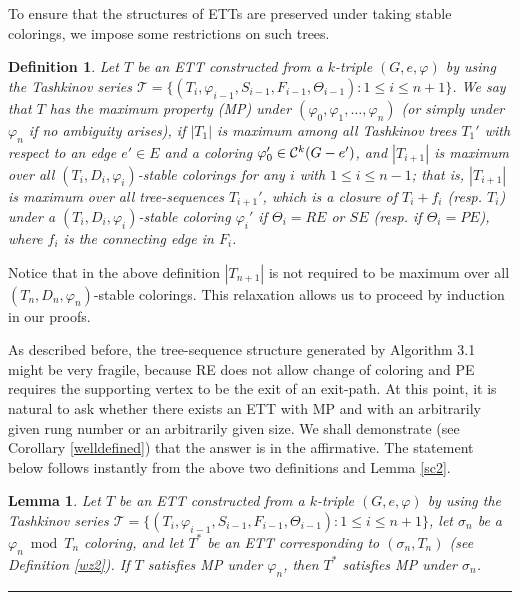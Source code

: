 \documentclass[11pt]{article}
\newtheorem{definition}[theorem]{Definition}
\newtheorem{lemma}[theorem]{Lemma}
\newcommand{\TT}{\mathcal {T}}
\newcommand{\phiv}{\varphi}
\def\qed{\hfill \rule{4pt}{7pt}}
\begin{document}
\vskip 2mm


To ensure that the structures of ETTs are preserved under taking stable colorings, we impose some restrictions
on such trees. 

\begin{definition} \label{wz3}
{\rm Let $T$ be an ETT constructed from a $k$-triple $(G,e, \varphi)$ by using the Tashkinov series 
$\TT=\{(T_i, \phiv_{i-1}, S_{i-1}, F_{i-1}, \Theta_{i-1}): 1\le i \le n+1\}$. We say that $T$ has the {\em maximum property}\label{maximumproperty} 
(MP) under $(\varphi_0, \varphi_1, \ldots, \varphi_n)$ (or simply under $\varphi_n$ if no ambiguity arises), 
if $|T_1|$ is maximum among all Tashkinov trees $T_1'$ with respect to an edge $e'\in E$ and a coloring $\varphi'_0 \in  {\cal C}^k(G-e')$, 
and $|T_{i+1}|$ is maximum over all $(T_{i}, D_i, \phiv_{i})$-stable colorings for any $i$ with 
$1\le i \le n-1$; that is, $|T_{i+1}|$ is maximum over all tree-sequences $T_{i+1}'$, which is a closure of $T_i+f_i$ 
(resp. $T_i$) under a $(T_{i}, D_i, \phiv_{i})$-stable coloring $\phiv_i'$ if $\Theta_i=RE$ or $SE$
(resp. if $\Theta_i=PE$), where $f_i$ is the connecting edge in $F_i$. }
\end{definition}

Notice that in the above definition $|T_{n+1}|$ is not required to be maximum over all $(T_n, D_n, \varphi_n)$-stable colorings. This relaxation 
allows us to proceed by induction in our proofs.

As described before, the tree-sequence structure generated by Algorithm 3.1 might be very fragile, because RE does not allow change of coloring and PE requires 
the supporting vertex to be the exit of an exit-path. At this point, it is natural to ask whether there exists an ETT with MP and with an arbitrarily given rung number or
an arbitrarily given size. We shall demonstrate (see Corollary \ref{welldefined}) that the answer is in the affirmative. The statement below follows instantly from the 
above two definitions and Lemma \ref{sc2}.

\begin{lemma}\label{MP}
Let $T$ be an ETT constructed from a $k$-triple $(G,e, \varphi)$ by using the Tashkinov series $\TT=\{(T_i, 
\phiv_{i-1}, S_{i-1}, F_{i-1}, \Theta_{i-1}): 1\le i \le n+1\}$, let $\sigma_n$ be a $\varphi_n \bmod T_n$ coloring, 
and let $T^*$ be an ETT corresponding to $(\sigma_n, T_n)$ (see Definition \ref{wz2}). If $T$ satisfies MP under 
$\varphi_n$, then $T^*$ satisfies MP under $\sigma_n$.  \qed
\end{lemma}
\end{document}
